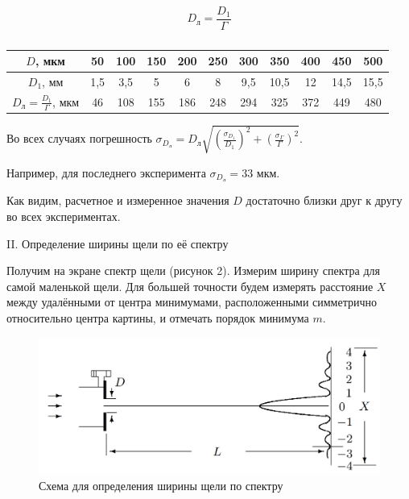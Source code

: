 \documentclass[a4paper,12pt]{article} %
\begin{document}
	\begin{equation*}
		D_{\text{л}} = \frac{D_1}{\Gamma}
	\end{equation*}
	
	\begin{table}[h!]
		\centering
		\begin{tabular}{|c|c|c|c|c|c|c|c|c|c|c|}
			\hline
			$D$, мкм                                 & 50  & 100 & 150 & 200 & 250 & 300 & 350  & 400 & 450  & 500  \\ \hline
			$D_1$, мм                                & 1,5 & 3,5 & 5   & 6   & 8   & 9,5 & 10,5 & 12  & 14,5 & 15,5 \\ \hline
			$D_{\text{л}} = \frac{D_1}{\Gamma}$, мкм & 46  & 108 & 155 & 186 & 248 & 294 & 325  & 372 & 449  & 480  \\ \hline
		\end{tabular}
	\caption{}
	\end{table}
	
	Во всех случаях погрешность $\sigma_{D_{\text{л}}} = D_{\text{л}}\sqrt{\left(\frac{\sigma_{D_1}}{D_1}\right)^2 + \left(\frac{\sigma_{\Gamma}}{\Gamma}\right)^2}$.
	
	Например, для последнего эксперимента $\sigma_{D_{\text{л}}} = 33$ мкм.
	
	Как видим, расчетное и измеренное значения $D$ достаточно близки друг к другу во всех экспериментах.
	
	\vspace{35mm}
	\begin{center}	
	II. Определение ширины щели по её спектру
	\end{center}
	Получим на экране спектр щели (рисунок 2). Измерим ширину спектра для самой маленькой щели. Для большей точности будем измерять расстояние $X$ между удалёнными от центра минимумами, расположенными симметрично относительно центра картины, и отмечать порядок минимума $m$.
	
	\newpage
	\begin{figure}[h!]
		\centering
		\includegraphics[scale=0.5]{Pictures/Спектр}
		\caption{Схема для определения ширины щели по спектру}
	\end{figure}
	
\end{document}
